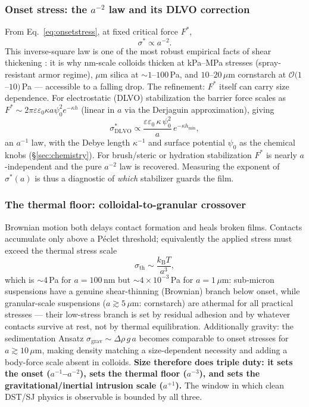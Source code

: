\documentclass[11pt]{article}
\newcommand{\sigmastar}{\sigma^{*}}
\newcommand{\Fstar}{F^{*}}
\begin{document}
\subsubsection{Onset stress: the $a^{-2}$ law and its DLVO correction}
From Eq.~\eqref{eq:onsetstress}, at fixed critical force $\Fstar$,
\begin{equation}
\sigmastar \propto a^{-2}.
\label{eq:sizescaling}
\end{equation}
This inverse-square law is one of the most robust empirical facts of shear thickening \cite{maranzano2001,guy2015,brown2014}: it is why nm-scale colloids thicken at kPa--MPa stresses (spray-resistant armor regime), $\mu$m silica at $\sim 1$--$100$\,Pa, and $10$--$20\,\mu$m cornstarch at $\mathcal{O}(1$--$10)$\,Pa --- accessible to a falling drop. The refinement: $\Fstar$ itself can carry size dependence. For electrostatic (DLVO) stabilization the barrier force scales as $\Fstar \sim 2\pi \varepsilon\varepsilon_0 \kappa a \psi_0^2 e^{-\kappa h}$ (linear in $a$ via the Derjaguin approximation), giving
\begin{equation}
\sigmastar_{\mathrm{DLVO}} \propto \frac{\varepsilon\varepsilon_0\,\kappa\,\psi_0^{2}}{a}\,e^{-\kappa h_{\min}},
\label{eq:dlvoonset}
\end{equation}
an $a^{-1}$ law, with the Debye length $\kappa^{-1}$ and surface potential $\psi_0$ as the chemical knobs (\S\ref{sec:chemistry}). For brush/steric or hydration stabilization $\Fstar$ is nearly $a$-independent and the pure $a^{-2}$ law is recovered. Measuring the exponent of $\sigmastar(a)$ is thus a diagnostic of \emph{which} stabilizer guards the film.

\subsubsection{The thermal floor: colloidal-to-granular crossover}
Brownian motion both delays contact formation and heals broken films. Contacts accumulate only above a P\'eclet threshold; equivalently the applied stress must exceed the thermal stress scale
\begin{equation}
\sigma_{\mathrm{th}} \sim \frac{k_{\mathrm{B}}T}{a^{3}},
\label{eq:thermalstress}
\end{equation}
which is $\sim 4$\,Pa for $a = 100$\,nm but $\sim 4\times 10^{-3}$\,Pa for $a = 1\,\mu$m: sub-micron suspensions have a genuine shear-thinning (Brownian) branch below onset, while granular-scale suspensions ($a \gtrsim 5\,\mu$m: cornstarch) are athermal for all practical stresses --- their low-stress branch is set by residual adhesion and by whatever contacts survive at rest, not by thermal equilibration. Additionally gravity: the sedimentation Ansatz $\sigma_{\mathrm{grav}} \sim \Delta\rho\, g\, a$ becomes comparable to onset stresses for $a \gtrsim 10\,\mu$m, making density matching a size-dependent necessity and adding a body-force scale absent in colloids. \textbf{Size therefore does triple duty: it sets the onset ($a^{-1}$--$a^{-2}$), sets the thermal floor ($a^{-3}$), and sets the gravitational/inertial intrusion scale ($a^{+1}$).} The window in which clean DST/SJ physics is observable is bounded by all three.
\end{document}
